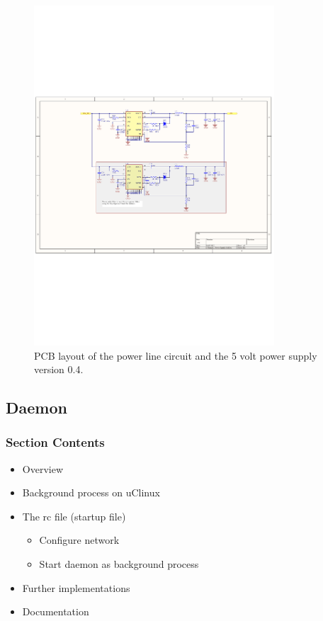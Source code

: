 \begin{figure}[H]
	\begin{centering}
		 \includegraphics[width=0.8\textwidth,page=3,angle=0]{images/SIG60_v0_4}
		\caption{PCB layout of the power line circuit and the 5 volt power supply version 0.4.}
	\end{centering}
\end{figure}


\subsection{Daemon}
\subsubsection{Section Contents}
\begin{itemize}
	\item Overview
	\item Background process on uClinux
	\item The rc file (startup file)
	\begin{itemize}
		\item Configure network
		\item Start daemon as background process
	\end{itemize}
	\item Further implementations
	\item Documentation
\end{itemize}

